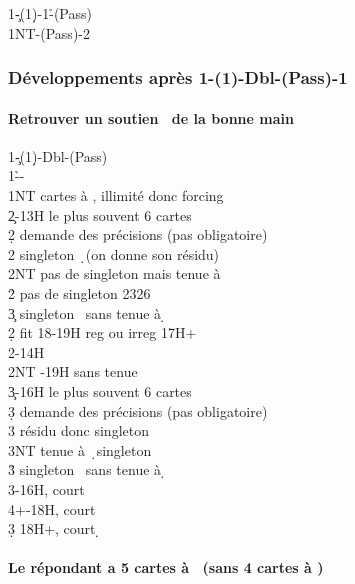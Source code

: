 \documentclass[a4paper]{article}
\begin{document}
\begin{bidtable}
1\c-(1\d)-1\h-(Pass)\\
1NT-(Pass)-2\s
\end{bidtable}

\subsubsection{Développements après 1\pdfc-(1\pdfd)-Dbl-(Pass)-1\pdfh}

\paragraph{Retrouver un soutien \pdfs\ de la bonne main}

\begin{bidtable}
1\c-(1\d)-Dbl-(Pass)\\
1\h--\\
1NT  cartes à \s , illimité donc forcing\+\\
2\c {}-13H le plus souvent 6 cartes\+\\
2\d \> demande des précisions (pas obligatoire)\+\\
2\s \> singleton \d\ (on donne son résidu)\\
2NT \> pas de singleton mais tenue à \d \\
2\h \> pas de singleton 2326\\
3\c \> singleton \s\ sans tenue à \d \-\-\\
2\d \> fit 18-19H reg ou irreg 17H+\\
2\s {}-14H\\
2NT -19H sans tenue\\
3\c {}-16H le plus souvent 6 cartes\+\\
3\d \> demande des précisions (pas obligatoire)\+\\
3\s \> résidu donc singleton \d \\
3NT \> tenue à \d\ singleton \s \\
3\h \> singleton \s\ sans tenue à \d \-\-\\
3\s {}-16H, court \d \\
4\s {}+-18H, court \d \\
3\d \> 18H+, court \d \-
\end{bidtable}

\paragraph{Le répondant a 5 cartes à \pdfh\ (sans 4 cartes à \pdfs)}
\end{document}
